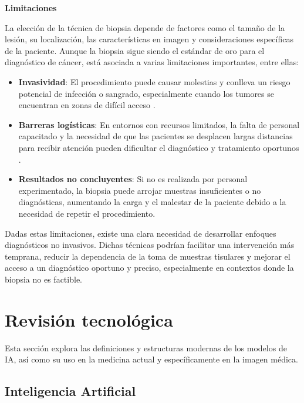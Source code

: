 \documentclass[a4paper,10pt]{book}
\begin{document}
\textbf{Limitaciones}

La elección de la técnica de biopsia depende de factores como el tamaño de la lesión, su localización, las características en imagen y consideraciones específicas de la paciente. Aunque la biopsia sigue siendo el estándar de oro para el diagnóstico de cáncer, está asociada a varias limitaciones importantes, entre ellas:

\begin{itemize}
    \item \textbf{Invasividad}: El procedimiento puede causar molestias y conlleva un riesgo potencial de infección o sangrado, especialmente cuando los tumores se encuentran en zonas de difícil acceso \cite{amino_pros_2024}.
    \item \textbf{Barreras logísticas}: En entornos con recursos limitados, la falta de personal capacitado y la necesidad de que las pacientes se desplacen largas distancias para recibir atención pueden dificultar el diagnóstico y tratamiento oportunos \cite{silva_breast_2023}.
    \item \textbf{Resultados no concluyentes}: Si no es realizada por personal experimentado, la biopsia puede arrojar muestras insuficientes o no diagnósticas, aumentando la carga y el malestar de la paciente debido a la necesidad de repetir el procedimiento.
\end{itemize}

Dadas estas limitaciones, existe una clara necesidad de desarrollar enfoques diagnósticos no invasivos. Dichas técnicas podrían facilitar una intervención más temprana, reducir la dependencia de la toma de muestras tisulares y mejorar el acceso a un diagnóstico oportuno y preciso, especialmente en contextos donde la biopsia no es factible.



\chapter{Revisión tecnológica}

Esta sección explora las definiciones y estructuras modernas de los modelos de IA, así como su uso en la medicina actual y específicamente en la imagen médica.

\section{Inteligencia Artificial}
\end{document}
